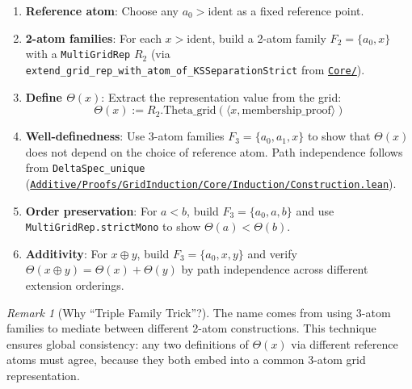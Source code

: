 \documentclass[11pt]{article}
\theoremstyle{definition}
\theoremstyle{remark}
\newtheorem{remark}[theorem]{Remark}
\begin{document}
\begin{enumerate}
\item \textbf{Reference atom}: Choose any $a_0 > \text{ident}$ as a fixed reference point.

\item \textbf{2-atom families}: For each $x > \text{ident}$, build a 2-atom family $F_2 = \{a_0, x\}$
with a \texttt{MultiGridRep} $R_2$ (via \texttt{extend\_grid\_rep\_with\_atom\_of\_KSSeparationStrict}
from \href{https://github.com/zariuq/ks-foundations-of-inference/tree/main/KnuthSkilling/Additive/Proofs/GridInduction/Core/}{\texttt{Core/}}).

\item \textbf{Define $\Theta(x)$}: Extract the representation value from the grid:
\[ \Theta(x) := R_2.\text{Theta\_grid}(\langle x, \text{membership\_proof} \rangle) \]

\item \textbf{Well-definedness}: Use 3-atom families $F_3 = \{a_0, a_1, x\}$ to show that $\Theta(x)$
does not depend on the choice of reference atom. Path independence follows from
\texttt{DeltaSpec\_unique} (\href{https://github.com/zariuq/ks-foundations-of-inference/blob/main/KnuthSkilling/Additive/Proofs/GridInduction/Core/Induction/Construction.lean}{\texttt{Additive/Proofs/GridInduction/Core/Induction/Construction.lean}}).

\item \textbf{Order preservation}: For $a < b$, build $F_3 = \{a_0, a, b\}$ and use
\texttt{MultiGridRep.strictMono} to show $\Theta(a) < \Theta(b)$.

\item \textbf{Additivity}: For $x \oplus y$, build $F_3 = \{a_0, x, y\}$ and verify
$\Theta(x \oplus y) = \Theta(x) + \Theta(y)$ by path independence across different extension orderings.
\end{enumerate}

\begin{remark}[Why ``Triple Family Trick''?]
The name comes from using 3-atom families to mediate between different 2-atom constructions.
This technique ensures global consistency: any two definitions of $\Theta(x)$ via different reference atoms
must agree, because they both embed into a common 3-atom grid representation.
\end{remark}
\end{document}
